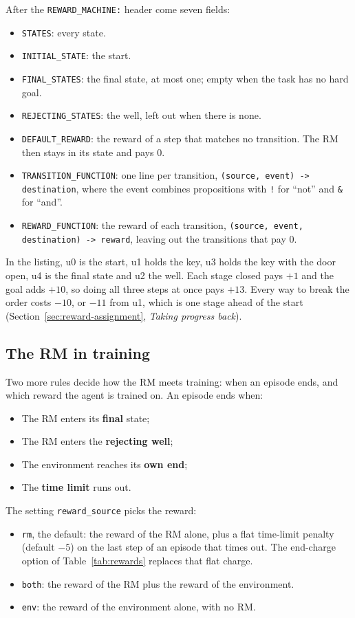 \documentclass[11pt,english,listoffigures,listoftables]{tfgetsinf}
\newcommand{\gain}[1]{\textcolor{green!40!black}{\bfseries\boldmath #1}}  %
\newcommand{\loss}[1]{\textcolor{red!60!black}{\bfseries\boldmath #1}}  %
\begin{document}
\noindent After the \texttt{REWARD\_MACHINE:} header come seven fields:
\begin{itemize}
    \item \texttt{STATES}: every state.
    \item \texttt{INITIAL\_STATE}: the start.
    \item \texttt{FINAL\_STATES}: the final state, at most one; empty when the task has no hard goal.
    \item \texttt{REJECTING\_\allowbreak STATES}: the well, left out when there is none.
    \item \texttt{DEFAULT\_REWARD}: the reward of a step that matches no transition. The RM then stays in its state and pays 0.
    \item \texttt{TRANSITION\_\allowbreak FUNCTION}: one line per transition, \texttt{(source, event) -> destination}, where the event combines propositions with \texttt{!} for ``not'' and \texttt{\&} for ``and''.
    \item \texttt{REWARD\_FUNCTION}: the reward of each transition, \texttt{(source, event, destination) -> reward}, leaving out the transitions that pay 0.
\end{itemize}

In the listing, u0 is the start, u1 holds the key, u3 holds the key with the door open, u4 is the final state and u2 the well. Each stage closed pays \gain{$+1$} and the goal adds \gain{$+10$}, so doing all three steps at once pays \gain{$+13$}. Every way to break the order costs \loss{$-10$}, or \loss{$-11$} from u1, which is one stage ahead of the start (Section~\ref{sec:reward-assignment}, \emph{Taking progress back}).

\subsection{The RM in training}
Two more rules decide how the RM meets training: when an episode ends, and which reward the agent is trained on. An episode ends when:
\begin{itemize}
    \item The RM enters its \textbf{final} state;
    \item The RM enters the \textbf{rejecting well};
    \item The environment reaches its \textbf{own end};
    \item The \textbf{time limit} runs out.
\end{itemize}


\noindent The setting \texttt{reward\_source} picks the reward:
\begin{itemize}
    \item \texttt{rm}, the default: the reward of the RM alone, plus a flat time-limit penalty (default \loss{$-5$}) on the last step of an episode that times out. The end-charge option of Table~\ref{tab:rewards} replaces that flat charge.
    \item \texttt{both}: the reward of the RM plus the reward of the environment.
    \item \texttt{env}: the reward of the environment alone, with no RM.
\end{itemize}
\end{document}

